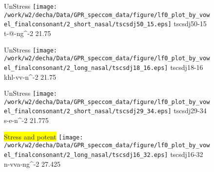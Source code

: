 \documentclass{article}
\begin{document}
\begin{figure}[t]
\begin{minipage}[b]{.24\textwidth}
UnStress
\centering
\texttt{[image: /work/w2/decha/Data/GPR\_speccom\_data/figure/lf0\_plot\_by\_vowel\_finalconsonant/2\_short\_nasal/tscsdj50\_15.eps]}
tscsdj50-15 t-@-ng\textasciicircum-2 21.75
\end{minipage}
\begin{minipage}[b]{.24\textwidth}
UnStress
\centering
\texttt{[image: /work/w2/decha/Data/GPR\_speccom\_data/figure/lf0\_plot\_by\_vowel\_finalconsonant/2\_long\_nasal/tscsdj18\_16.eps]}
tscsdj18-16 khl-vv-n\textasciicircum-2 21.75
\end{minipage}
\begin{minipage}[b]{.24\textwidth}
UnStress
\centering
\texttt{[image: /work/w2/decha/Data/GPR\_speccom\_data/figure/lf0\_plot\_by\_vowel\_finalconsonant/2\_short\_nasal/tscsdj29\_34.eps]}
tscsdj29-34 s-e-n\textasciicircum-2 21.775
\end{minipage}
\begin{minipage}[b]{.24\textwidth}
\colorbox{yellow}{Stress and potent}
\centering
\texttt{[image: /work/w2/decha/Data/GPR\_speccom\_data/figure/lf0\_plot\_by\_vowel\_finalconsonant/2\_long\_nasal/tscsdj16\_32.eps]}
tscsdj16-32 n-vva-ng\textasciicircum-2 27.425
\end{minipage}
\end{figure}
\end{document}
